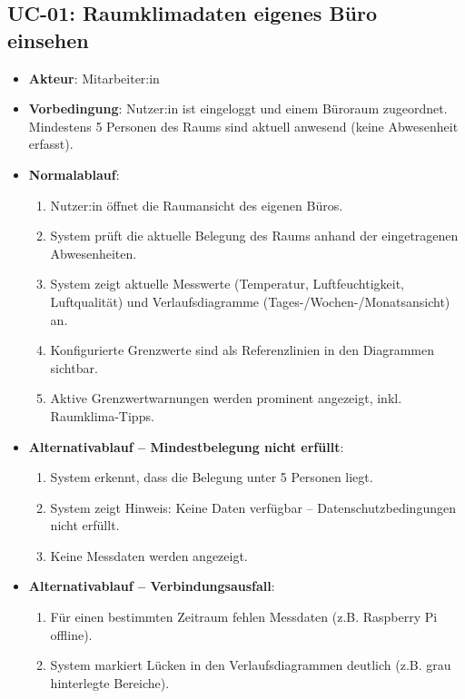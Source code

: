 \documentclass[12pt,a4paper]{article}
\begin{document}
\subsection{UC-01: Raumklimadaten eigenes Büro einsehen}
\begin{itemize}
	\item \textbf{Akteur}: Mitarbeiter:in
	\item \textbf{Vorbedingung}: Nutzer:in ist eingeloggt und einem Büroraum zugeordnet. Mindestens 5 Personen des Raums sind aktuell anwesend (keine Abwesenheit erfasst).
	\item \textbf{Normalablauf}:
	\begin{enumerate}
		\item Nutzer:in öffnet die Raumansicht des eigenen Büros.
		\item System prüft die aktuelle Belegung des Raums anhand der eingetragenen Abwesenheiten.
		\item System zeigt aktuelle Messwerte (Temperatur, Luftfeuchtigkeit, Luftqualität) und Verlaufsdiagramme (Tages-/Wochen-/Monatsansicht) an.
		\item Konfigurierte Grenzwerte sind als Referenzlinien in den Diagrammen sichtbar.
		\item Aktive Grenzwertwarnungen werden prominent angezeigt, inkl. Raumklima-Tipps.
	\end{enumerate}
	\item \textbf{Alternativablauf -- Mindestbelegung nicht erfüllt}:
	\begin{enumerate}
		\item System erkennt, dass die Belegung unter 5 Personen liegt.
		\item System zeigt Hinweis: \glqq Keine Daten verfügbar -- Datenschutzbedingungen nicht erfüllt.\grqq
		\item Keine Messdaten werden angezeigt.
	\end{enumerate}
	\item \textbf{Alternativablauf -- Verbindungsausfall}:
	\begin{enumerate}
		\item Für einen bestimmten Zeitraum fehlen Messdaten (z.B. Raspberry Pi offline).
		\item System markiert Lücken in den Verlaufsdiagrammen deutlich (z.B. grau hinterlegte Bereiche).
	\end{enumerate}
\end{itemize}
\end{document}
